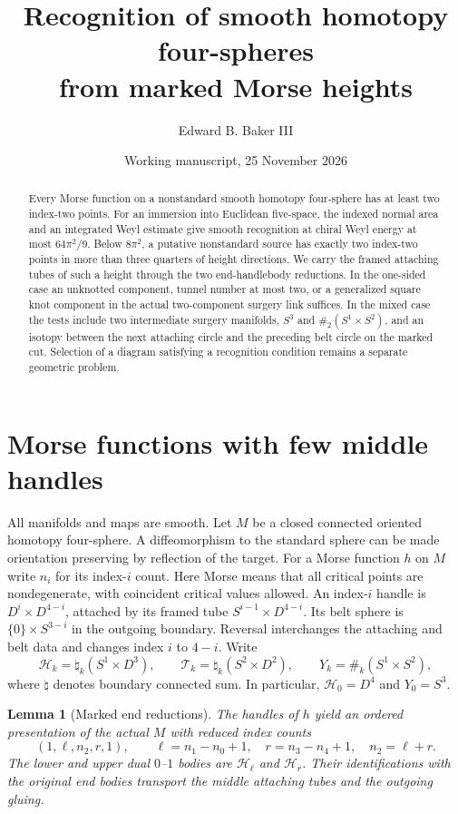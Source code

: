 \documentclass[11pt,letterpaper]{article}
\title{Recognition of smooth homotopy four-spheres\\from marked Morse heights}
\author{Edward B. Baker III}
\date{Working manuscript, 25 November 2026}
\numberwithin{equation}{section}
\newtheorem{lemma}[theorem]{Lemma}
\newcommand{\HB}[1]{\mathcal H_{#1}}
\newcommand{\TB}[1]{\mathcal T_{#1}}
\begin{document}
\maketitle
\begin{abstract}
Every Morse function on a nonstandard smooth homotopy four-sphere has
at least two index-two points. For an immersion into Euclidean
five-space, the indexed normal area and an integrated Weyl estimate
give smooth recognition at chiral Weyl energy at most \(64\pi^2/9\).
Below \(8\pi^2\), a putative nonstandard source has exactly two
index-two points in more than three quarters of height directions.
We carry the framed attaching tubes of such a height through the
two end-handlebody reductions. In the one-sided case an unknotted
component, tunnel number at most two, or a generalized square knot
component in the actual two-component surgery link suffices. In the
mixed case the tests include two intermediate surgery manifolds,
\(S^3\) and \(\#_2(S^1\times S^2)\), and an isotopy between the
next attaching circle and the preceding belt circle on the marked
cut. Selection of a diagram satisfying a recognition condition
remains a separate geometric problem.
\end{abstract}

\section{Morse functions with few middle handles}\label{sec:marked}

All manifolds and maps are smooth. Let \(M\) be a closed connected
oriented homotopy four-sphere. A diffeomorphism to the standard sphere
can be made orientation preserving by reflection of the target.
For a Morse function \(h\) on \(M\)
write \(n_i\) for its index-\(i\) count. Here Morse means that all
critical points are nondegenerate, with coincident critical values
allowed. An index-\(i\) handle is
\(D^i\times D^{4-i}\), attached by its framed tube
\(S^{i-1}\times D^{4-i}\). Its belt sphere is
\(\{0\}\times S^{3-i}\) in the outgoing boundary. Reversal
interchanges the attaching and belt data and changes index \(i\) to
\(4-i\). Write
\[
 \HB{k}=\natural_k(S^1\times D^3),\qquad
 \TB{k}=\natural_k(S^2\times D^2),\qquad
 Y_k=\#_k(S^1\times S^2),
\]
where \(\natural\) denotes boundary connected sum. In particular,
\(\HB{0}=D^4\) and \(Y_0=S^3\).

\begin{lemma}[Marked end reductions]\label{lem:trees}
The handles of \(h\) yield an ordered presentation of the actual \(M\)
with reduced index counts
\[
 (1,\ell,n_2,r,1),\qquad
 \ell=n_1-n_0+1,\quad r=n_3-n_4+1,\quad n_2=\ell+r .
\]
The lower and upper dual \(0\)--\(1\) bodies are \(\HB{\ell}\) and
\(\HB{r}\). Their identifications with the original end bodies
transport the middle attaching tubes and the outgoing gluing.
\end{lemma}
\end{document}
